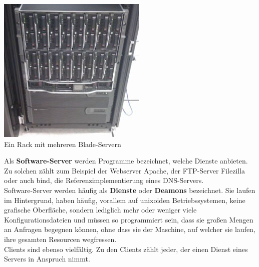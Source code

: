 \documentclass[12pt,a4paper]{report}
\begin{document}
\begin{onehalfspace}
\begin{center}
\includegraphics[scale=0.8]{../docs/tarkes/pics/ServerRack.jpg}\\
Ein Rack mit mehreren Blade-Servern 
\end{center}

Als \textbf{Software-Server} werden Programme bezeichnet, welche Dienste anbieten. Zu solchen zählt zum Beispiel der Webserver Apache, der FTP-Server Filezilla oder auch bind, die Referenzimplementierung eines DNS-Servers.\\
Software-Server werden häufig als \textbf{Dienste} oder \textbf{Deamons} bezeichnet. Sie laufen im Hintergrund, haben häufig, vorallem auf unixoiden Betriebssystemen, keine grafische Oberfläche, sondern lediglich mehr oder weniger viele Konfigurationsdateien und müssen so programmiert sein, dass sie großen Mengen an Anfragen begegnen können, ohne dass sie der Maschine, auf welcher sie laufen, ihre gesamten Resourcen wegfressen.\\

Clients sind ebenso vielfältig. Zu den Clients zählt jeder, der einen Dienst eines Servers in Anspruch nimmt. 

\end{onehalfspace}
\end{document}
